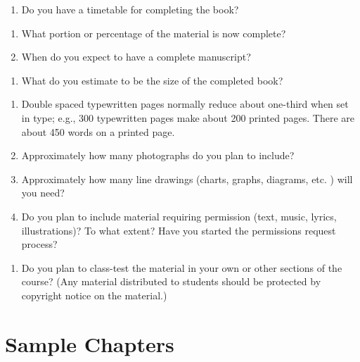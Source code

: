 \documentclass[10pt,dvipsnames,enabledeprecatedfontcommands]{scrartcl}
\providecommand{\tightlist}{%
  \setlength{\itemsep}{0pt}\setlength{\parskip}{0pt}}
\begin{document}
\begin{enumerate}
\def\labelenumi{\arabic{enumi}.}
\tightlist
\item
  Do you have a timetable for completing the book?
\end{enumerate}

\begin{enumerate}
\def\labelenumi{\alph{enumi}.}
\item
  What portion or percentage of the material is now complete?
\item
  When do you expect to have a complete manuscript?
\end{enumerate}

\begin{enumerate}
\def\labelenumi{\arabic{enumi}.}
\setcounter{enumi}{1}
\tightlist
\item
  What do you estimate to be the size of the completed book?
\end{enumerate}

\begin{enumerate}
\def\labelenumi{\alph{enumi}.}
\item
  Double spaced typewritten pages normally reduce about one-third when
  set in type; e.g., 300 typewritten pages make about 200 printed pages.
  There are about 450 words on a printed page.
\item
  Approximately how many photographs do you plan to include?
\item
  Approximately how many line drawings (charts, graphs, diagrams, etc. )
  will you need?
\item
  Do you plan to include material requiring permission (text, music,
  lyrics, illustrations)? To what extent? Have you started the
  permissions request process?
\end{enumerate}

\begin{enumerate}
\def\labelenumi{\arabic{enumi}.}
\setcounter{enumi}{2}
\tightlist
\item
  Do you plan to class-test the material in your own or other sections
  of the course? (Any material distributed to students should be
  protected by copyright notice on the material.)
\end{enumerate}

\hypertarget{sample-chapters}{%
\section{Sample Chapters}\label{sample-chapters}}
\end{document}
